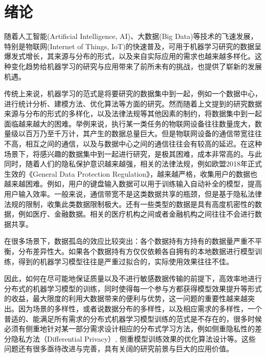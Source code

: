 \section{绪论}
\label{sec:chap1-introduction}


随着人工智能(Artificial Intelligence, AI)、大数据(Big Data)等技术的飞速发展，特别是物联网(Internet of Things, IoT)的快速普及，可用于机器学习研究的数据呈爆发式增长，其来源与分布的形式，以及来自实际应用的需求也越来越多样化。这种变化趋势给机器学习的研究与应用带来了前所未有的挑战，也提供了崭新的发展机遇。

传统上来说，机器学习的范式是将要研究的数据集中到一起，例如一个数据中心，进行统计分析、建模方法、优化算法等方面的研究。然而随着上文提到的研究数据来源与分布的形式的多样化，以及法律法规等其他因素的制约，将数据集中到一起面临越来越大的困难。举例来说，执行某一类任务的物联网设备往往数量庞大，数量级以百万乃至千万计，其产生的数据总量巨大。但是物联网设备的通信带宽往往不高，相互之间的通信，以及与数据中心之间的通信往往会有较高的延迟。在这种场景下，将感兴趣的数据集中到一起进行研究，是极其困难，成本非常高的。与此同时，随着人们的隐私保护意识越来越强，相关的法律法规，例如欧盟2018年正式生效的《General Data Protection Regulation》，越来越严格，收集用户的数据也越来越困难\citep{Albrecht_2016}。例如，用户的键盘输入数据可以用于训练输入自动补全的模型，提高用户输入效率\citep{fl_keyboard}。一般来说，通信带宽不是这类数据共享的瓶颈，但是基于隐私法律法规的限制，收集此类数据限制极大。还有一些类型的数据是具有高度机密性的数据，例如医疗、金融数据。相关的医疗机构之间或者金融机构之间往往不会进行数据共享。

在很多场景下，数据孤岛的效应比较突出：各个数据持有方持有的数据量严重不平衡，分布差异性大。如果各个数据持有方仅仅依赖各自拥有的本地数据进行模型训练，得到的机器学习模型往往是严重过拟合的，实际使用效果往往不佳。

因此，如何在尽可能地保证质量以及不进行敏感数据传输的前提下，高效率地进行分布式的机器学习模型的训练，同时使得每一个参与方都获得模型效果提升等形式的收益，最大限度的利用大数据带来的便利与优势，这一问题的重要性越来越突出。因为场景的多样性，或者说数据分布的多样性，以及相应需求的多样性，一个普适的、能满足所有需求的分布式机器学习模型训练的范式是不存在的，很多时候必须有侧重地针对某一部分需求设计相应的分布式学习方法，例如侧重隐私性的差分隐私方法（Differential Privacy）\citep{Dwork_2008_DP}, 侧重模型训练效果的优化算法设计\citep{boyd2011distributed}等。这些问题还有很多亟待改进与完善，具有关阔的研究前景与巨大的应用价值。
